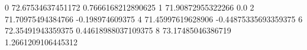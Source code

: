 0 72.67534637451172 0.7666168212890625
1 71.90872955322266 0.0
2 71.70975494384766 -0.198974609375
4 71.45997619628906 -0.44875335693359375
6 72.35491943359375 0.44618988037109375
8 73.17485046386719 1.2661209106445312
